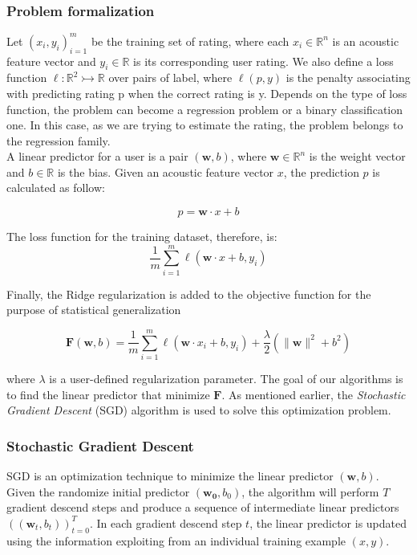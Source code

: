 \subsubsection{Problem formalization}
Let \({(x_i, y_i)}_{i=1}^{m}\) be the training set of rating, where each \(x_i \in \mathbb{R}^n\) is an acoustic feature vector and \(y_i \in \mathbb{R} \) is its corresponding user rating. We also define a loss function \( \ell : \mathbb{R}^2 \rightarrowtail \mathbb{R}\) over pairs of label, where \( \ell(p,y) \) is the penalty associating with predicting rating p when the correct rating is y. Depends on the type of loss function, the problem can become a regression problem or a binary classification one. In this case, as we are trying to estimate the rating, the problem belongs to the regression family. \\

\noindent A linear predictor for a user is a pair \(( \mathbf{w}, b)\), where \( \mathbf{w} \in \mathbb{R}^n \) is the weight vector and \(b \in \mathbb{R} \) is the bias. Given an acoustic feature vector \( x \), the prediction \(p\) is calculated as follow:

\begin{displaymath}
p = \mathbf{w} \cdot x + b
\end{displaymath} 

\noindent The loss function for the training dataset, therefore, is:
\begin{displaymath}
\frac{1}{m} \sum_{i=1}^{m} \ell (\mathbf{w} \cdot x + b, y_i)
\end{displaymath}

\noindent Finally, the Ridge regularization is added to the objective function for the purpose of statistical generalization \cite{du2013neural}

\begin{displaymath}
\mathbf{F} (\mathbf{w}, b) = \frac{1}{m} \sum_{i=1}^{m} \ell (\mathbf{w} \cdot x_i + b, y_i) + \frac{\lambda}{2} (\lVert \mathbf{w} \rVert^2 + b^2) \tag{1} \label{eq:1}
\end{displaymath}

\noindent where \(\lambda\) is a user-defined regularization parameter. The goal of our algorithms is to find the linear predictor that minimize \(\mathbf{F}\). As mentioned earlier, the \textit{Stochastic Gradient Descent} (SGD) algorithm is used to solve this optimization problem.

\subsubsection{Stochastic Gradient Descent}
SGD is an optimization technique to minimize the linear predictor \( (\mathbf{w}, b) \). Given the randomize initial predictor \( (\mathbf{w_0}, b_0) \), the algorithm will perform \(T\) gradient descend steps and produce a sequence of intermediate linear predictors \( ((\mathbf{w}_t, b_t))_{t=0}^{T} \). In each gradient descend step \(t\), the linear predictor is updated using the information exploiting from an individual training example \( (x, y)\). 


